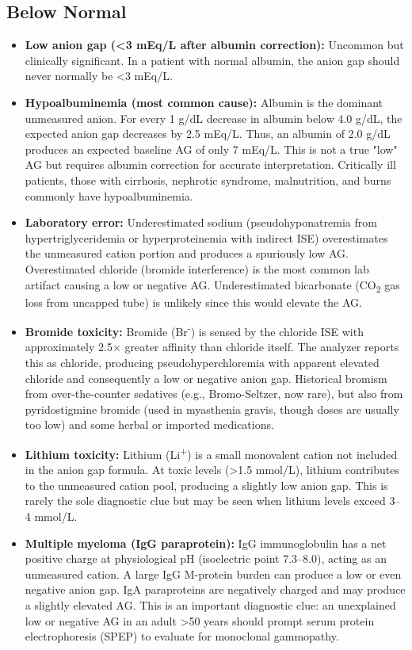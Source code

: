 \subsection*{Below Normal}
\begin{itemize}
  \item \textbf{Low anion gap (<3 mEq/L after albumin correction):} Uncommon but clinically significant. In a patient with normal albumin, the anion gap should never normally be <3 mEq/L.
  \item \textbf{Hypoalbuminemia (most common cause):} Albumin is the dominant unmeasured anion. For every 1 g/dL decrease in albumin below 4.0 g/dL, the expected anion gap decreases by 2.5 mEq/L. Thus, an albumin of 2.0 g/dL produces an expected baseline AG of only 7 mEq/L. This is not a true "low" AG but requires albumin correction for accurate interpretation. Critically ill patients, those with cirrhosis, nephrotic syndrome, malnutrition, and burns commonly have hypoalbuminemia.
  \item \textbf{Laboratory error:} Underestimated sodium (pseudohyponatremia from hypertriglyceridemia or hyperproteinemia with indirect ISE) overestimates the unmeasured cation portion and produces a spuriously low AG. Overestimated chloride (bromide interference) is the most common lab artifact causing a low or negative AG. Underestimated bicarbonate (CO\textsubscript{2} gas loss from uncapped tube) is unlikely since this would elevate the AG.
  \item \textbf{Bromide toxicity:} Bromide (Br\textsuperscript{-}) is sensed by the chloride ISE with approximately 2.5$\times$ greater affinity than chloride itself. The analyzer reports this as chloride, producing pseudohyperchloremia with apparent elevated chloride and consequently a low or negative anion gap. Historical bromism from over-the-counter sedatives (e.g., Bromo-Seltzer, now rare), but also from pyridostigmine bromide (used in myasthenia gravis, though doses are usually too low) and some herbal or imported medications.
  \item \textbf{Lithium toxicity:} Lithium (Li\textsuperscript{+}) is a small monovalent cation not included in the anion gap formula. At toxic levels (>1.5 mmol/L), lithium contributes to the unmeasured cation pool, producing a slightly low anion gap. This is rarely the sole diagnostic clue but may be seen when lithium levels exceed 3--4 mmol/L.
  \item \textbf{Multiple myeloma (IgG paraprotein):} IgG immunoglobulin has a net positive charge at physiological pH (isoelectric point 7.3--8.0), acting as an unmeasured cation. A large IgG M-protein burden can produce a low or even negative anion gap. IgA paraproteins are negatively charged and may produce a slightly elevated AG. This is an important diagnostic clue: an unexplained low or negative AG in an adult >50 years should prompt serum protein electrophoresis (SPEP) to evaluate for monoclonal gammopathy.

\end{itemize}
